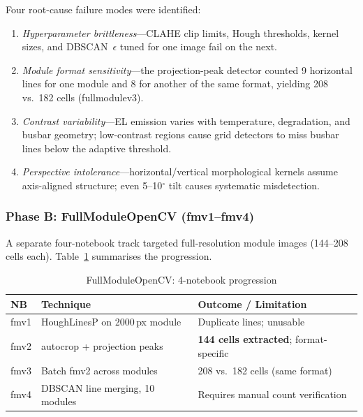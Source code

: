 \documentclass[conference]{IEEEtran}
\begin{document}
Four root-cause failure modes were identified:
\begin{enumerate}
  \item \textit{Hyperparameter brittleness}---CLAHE clip
        limits, Hough thresholds, kernel sizes, and
        DBSCAN~$\epsilon$ tuned for one image fail on the next.
  \item \textit{Module format sensitivity}---the projection-peak
        detector counted 9 horizontal lines for one module and
        8 for another of the same format, yielding 208 vs.\
        182 cells (fullmodulev3).
  \item \textit{Contrast variability}---EL emission varies with
        temperature, degradation, and busbar geometry;
        low-contrast regions cause grid detectors to miss
        busbar lines below the adaptive threshold.
  \item \textit{Perspective intolerance}---horizontal/vertical
        morphological kernels assume axis-aligned structure;
        even 5--10$^\circ$ tilt causes systematic misdetection.
\end{enumerate}

\subsubsection{Phase B: FullModuleOpenCV (fmv1--fmv4)}

A separate four-notebook track targeted full-resolution
module images (144--208 cells each).
Table~\ref{tab:classical_full} summarises the progression.

\begin{table}[t]
  \caption{FullModuleOpenCV: 4-notebook progression}
  \label{tab:classical_full}
  \begin{center}
  \renewcommand{\arraystretch}{1.05}
  \small
  \begin{tabular}{p{0.7cm}p{2.1cm}p{3.4cm}}
    \toprule
    \textbf{NB} & \textbf{Technique} &
    \textbf{Outcome / Limitation} \\
    \midrule
    fmv1 & HoughLinesP on 2000\,px module &
           Duplicate lines; unusable \\
    fmv2 & autocrop + projection peaks &
           \textbf{144 cells extracted}; format-specific \\
    fmv3 & Batch fmv2 across modules &
           208 vs.\ 182 cells (same format) \\
    fmv4 & DBSCAN line merging, 10 modules &
           Requires manual count verification \\
    \bottomrule
  \end{tabular}
  \end{center}
\end{table}
\end{document}
